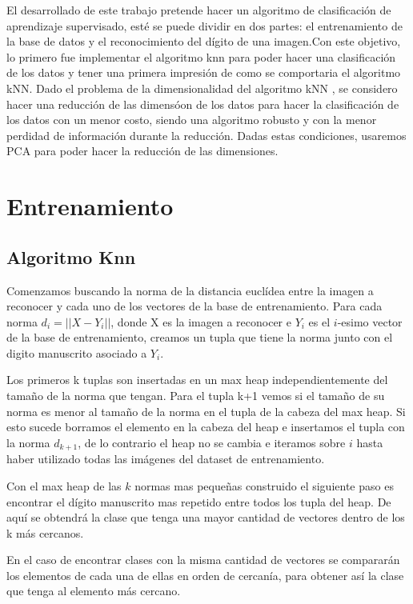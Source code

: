 El desarrollado de este trabajo pretende hacer un algoritmo de clasificación de
aprendizaje supervisado, esté se puede dividir en dos partes: el entrenamiento
de la base de datos y el reconocimiento del dígito de una imagen.Con este
objetivo, lo primero fue implementar el algoritmo knn para poder hacer una
clasificación de los datos y tener una primera impresión de como se comportaria
el algoritmo kNN. Dado el problema de la dimensionalidad del algoritmo kNN , se
considero hacer una reducción de las dimensóon de los datos para hacer la
clasificación de los datos con un menor costo, siendo una algoritmo robusto y
con la menor perdidad de información durante la reducción. Dadas estas
condiciones, usaremos PCA para poder hacer la reducción de las dimensiones.  


\section{Entrenamiento}

\subsection{Algoritmo Knn}
Comenzamos buscando la norma de la distancia euclídea entre la imagen a reconocer y cada uno de los vectores de la base de entrenamiento. Para cada norma $d_{i}=||X-Y_{i}||$, donde X es la imagen a reconocer e $Y_{i}$ es el $i$-esimo vector de la base de entrenamiento, creamos un tupla que tiene la norma junto con el digito manuscrito asociado a $Y_{i}$.\par
\indent Los primeros k tuplas son insertadas en un max heap independientemente del tamaño de la norma que tengan. Para el tupla k+1 vemos si el tamaño de su norma es menor al tamaño de la norma en el tupla de la cabeza del max heap. Si esto sucede borramos el elemento en la cabeza del heap e insertamos el tupla con la norma $d_{k+1}$, de lo contrario el heap no se cambia e iteramos sobre $i$ hasta haber utilizado todas las imágenes del dataset de entrenamiento. \par
\indent Con el max heap de las $k$ normas mas pequeñas construido el siguiente paso es encontrar el dígito manuscrito mas repetido entre todos los tupla del heap. De aquí se obtendrá la clase que tenga una mayor cantidad de vectores dentro de los k más cercanos.\par
\indent En el caso de encontrar clases con la misma cantidad de vectores se compararán los elementos de cada una de ellas en orden de cercanía, para obtener así la clase que tenga al elemento más cercano.\par

